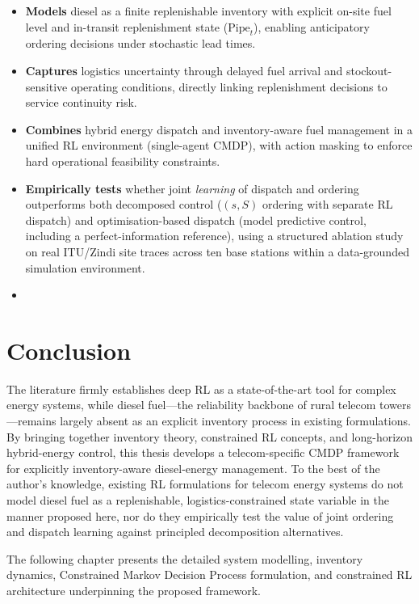 \begin{itemize}
    \item \textbf{Models} diesel as a finite replenishable inventory with
    explicit on-site fuel level and in-transit replenishment state
    ($\mathrm{Pipe}_t$), enabling anticipatory ordering decisions under
    stochastic lead times.

    \item \textbf{Captures} logistics uncertainty through delayed fuel
    arrival and stockout-sensitive operating conditions, directly linking
    replenishment decisions to service continuity risk.

    \item \textbf{Combines} hybrid energy dispatch and inventory-aware
    fuel management in a unified RL environment (single-agent CMDP),
    with action masking to enforce hard operational feasibility constraints.

    \item \textbf{Empirically tests} whether joint \emph{learning} of
    dispatch and ordering outperforms both decomposed control
    ($(s,S)$ ordering with separate RL dispatch) and
    optimisation-based dispatch (model predictive control, including a
    perfect-information reference), using a structured ablation study on
    real ITU/Zindi site traces across ten base stations within a
    data-grounded simulation environment.

    \item {}
\end{itemize}

\section{Conclusion}

The literature firmly establishes deep RL as a state-of-the-art tool for
complex energy systems, while diesel fuel---the reliability backbone of
rural telecom towers---remains largely absent as an explicit inventory
process in existing formulations.
By bringing together inventory theory, constrained RL concepts, and long-horizon
hybrid-energy control, this thesis develops a telecom-specific CMDP
framework for explicitly inventory-aware diesel-energy management.  To
the best of the author's knowledge, existing RL formulations for telecom
energy systems do not model diesel fuel as a replenishable,
logistics-constrained state variable in the manner proposed here, nor do
they empirically test the value of joint ordering and dispatch learning
against principled decomposition alternatives.

The following chapter presents the detailed system modelling, inventory
dynamics, Constrained Markov Decision Process formulation, and constrained
RL architecture underpinning the proposed framework.
\clearpage